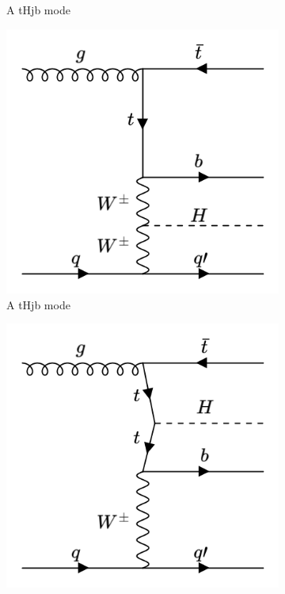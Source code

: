 \begin{figure}[htp]
\begin{subfigure}[b]{0.3\textwidth}
         \caption{A tHjb mode}
         \label{fig:tHjb2}
     \end{subfigure}
     \hfill
         \begin{subfigure}[b]{0.3\textwidth}
         \centering
         \includegraphics[width=\textwidth]{figures/theory_chapter/tHjb3.png}
         \caption{A tHjb mode}
         \label{fig:tHjb3}
     \end{subfigure}
     \hfill
         \begin{subfigure}[b]{0.3\textwidth}
         \centering
         \includegraphics[width=\textwidth]{figures/theory_chapter/tHjb4.png}

\end{subfigure}
\end{figure}
